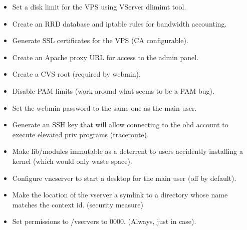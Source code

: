\begin{itemize}
\begin{itemize}
    \item
      Set a disk limit for the VPS using VServer dlimimt tool.
      
    \item
      Create an RRD database and iptable rules for bandwidth
      accounting.

    \item
      Generate SSL certificates for the VPS (CA configurable).

    \item
      Create an Apache proxy URL for access to the admin panel.

    \item
      Create a CVS root (required by webmin).

    \item
      Disable PAM limits (work-around what seems to be a PAM bug).

    \item
      Set the webmin password to the same one as the main user.
	
    \item
      Generate an SSH key that will allow connecting to the ohd
      account to execute elevated priv programs (traceroute).
	
    \item
      Make lib/modules immutable as a deterrent to users accidently
      installing a kernel (which would only waste space).
	
    \item
      Configure vncserver to start a desktop for the main user (off
      by default).

    \item
      Make the location of the vserver a symlink to a directory
      whose name matches the context id. (security measure)

    \item
      Set permissions to /vservers to 0000. (Always, just in case).
      
    \end{itemize}

\end{itemize}
